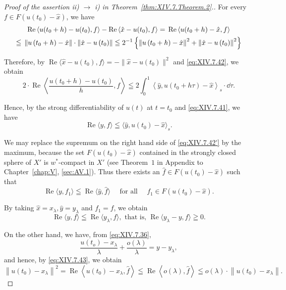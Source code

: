 \begin{proof}[Proof of the assertion ii) $\rightarrow$ i) in Theorem~\ref{thm:XIV.7.Theorem.2}.]
For every $f \in F(u(t_0) - \hat{x})$, we have 
\begin{gather}\operatorname{Re} \left\langle u (t _{0} + h) - u (t _{0}), f \right\rangle - \operatorname{Re} \left\langle \hat {x} - u (t _{0}), f \right\rangle = {} \operatorname{Re} \left\langle u (t _{0} + h) - \hat {x}, f \right\rangle \notag \\\leqq {} \left\| u \left(t _{0} + h\right) - \hat {x} \right\| \cdot \left\| \hat {x} - u \left(t _{0}\right) \right\| \leqq {} 2 ^{-1} \left\{\left\| u \left(t _{0} + h\right) - \hat {x} \right\| ^{2} + \left\| \hat {x} - u \left(t _{0}\right) \right\| ^{2} \right\} \notag
\end{gather}

Therefore, by $\operatorname{Re}\langle \hat{x} - u(t_0), f \rangle = -\|\hat{x} - u(t_0)\|^2$ and \eqref{eq:XIV.7.42}, we obtain 
\[
2 \cdot \operatorname{Re} \left\langle \frac {u (t _{0} + h) - u (t _{0})}{h}, f \right\rangle \leqq 2 \int_{0} ^{1} \left\langle \hat {y}, u (t _{0} + h \tau) - \hat {x} \right\rangle_{s} \cdot \dd \tau .
\]

Hence, by the strong differentiability of $u(t)$ at $t = t_0$ and \eqref{eq:XIV.7.41}, we have 
\begin{equation}\tag{42'}\label{eq:XIV.7.42'}
\operatorname{Re} \langle y, f \rangle \leqq \langle \hat {y}, u (t _{0}) - \hat {x} \rangle_{s}.
\end{equation}

We may replace the supremum on the right hand side of \eqref{eq:XIV.7.42'} by the maximum, because the set $F(u(t_0) - \hat{x})$ contained in the strongly closed sphere of $X'$ is $w^*$-compact in $X'$ (see Theorem~\hyperref[thm:AV.1.Theorem.1]{$1$} in Appendix to Chapter~\ref{chap:V}, \ref{sec:AV.1}). Thus there exists an $\hat{f} \in F(u(t_0) - \hat{x})$ such that 
\[
\operatorname{Re} \langle y, f _{1} \rangle \leqq \operatorname{Re} \langle \hat {y}, \hat {f} \rangle \quad \text{ for all } \quad f _{1} \in F (u (t _{0}) - \hat {x}).
\]

By taking $\hat{x} = x_{\lambda},\hat{y} = y_{\lambda}$ and $f_{1} = f$, we obtain 
\begin{equation}\label{eq:XIV.7.43}
\operatorname{Re} \langle y, f \rangle \leqq \operatorname{Re} \langle y _{\lambda}, f \rangle , \text{ that is, } \operatorname{Re} \langle y _{\lambda} - y, f \rangle \geqq 0.
\end{equation}

On the other hand, we have, from \eqref{eq:XIV.7.36}, 
\begin{equation}\label{eq:XIV.7.44}
\frac {u \left(t _{o}\right) - x _{\lambda}}{\lambda} + \frac {o (\lambda)}{\lambda} = y - y _{\lambda},
\end{equation}
and hence, by \eqref{eq:XIV.7.43}, we obtain 
\[
\left\| u \left(t _{0}\right) - x _{\lambda} \right\| ^{2} = \operatorname{Re} \left\langle u \left(t _{0}\right) - x _{\lambda}, \hat {f} \right\rangle \leqq \operatorname{Re} \left\langle o (\lambda), \hat {f} \right\rangle \leqq o (\lambda) \cdot \left\| u \left(t _{0}\right) - x _{\lambda} \right\|.
\]


\end{proof}
